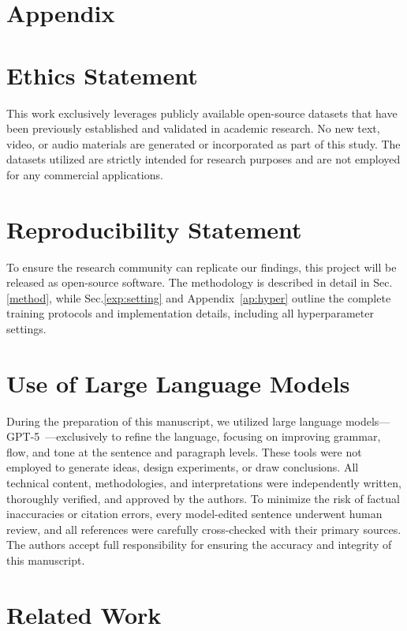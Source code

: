 \section*{Appendix}

\section{Ethics Statement}
This work exclusively leverages publicly available open-source datasets that have been previously established and validated in academic research. No new text, video, or audio materials are generated or incorporated as part of this study. The datasets utilized are strictly intended for research purposes and are not employed for any commercial applications.


\section{Reproducibility Statement}
To ensure the research community can replicate our findings, this project will be released as open-source software. The methodology is described in detail in Sec.\ref{method}, while Sec.\ref{exp:setting} and Appendix~\ref{ap:hyper} outline the complete training protocols and implementation details, including all hyperparameter settings.

\section{Use of Large Language Models}

During the preparation of this manuscript, we utilized large language models—GPT-5~\citep{openai2025gpt5}—exclusively to refine the language, focusing on improving grammar, flow, and tone at the sentence and paragraph levels. These tools were not employed to generate ideas, design experiments, or draw conclusions. All technical content, methodologies, and interpretations were independently written, thoroughly verified, and approved by the authors. To minimize the risk of factual inaccuracies or citation errors, every model-edited sentence underwent human review, and all references were carefully cross-checked with their primary sources. The authors accept full responsibility for ensuring the accuracy and integrity of this manuscript.

\section{Related Work}\label{related}

